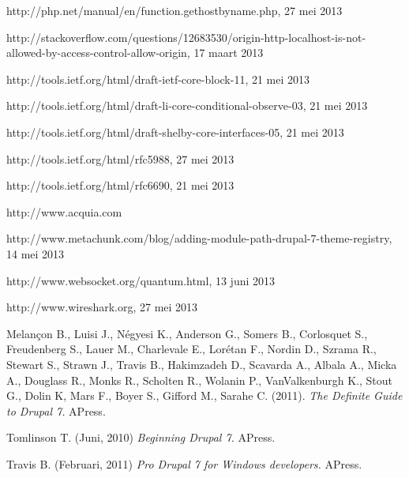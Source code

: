 \begin{thebibliography}{99}
 http://php.net/manual/en/function.gethostbyname.php, 27 mei 2013

 http://stackoverflow.com/questions/12683530/origin-http-localhost-is-not-allowed-by-access-control-allow-origin, 17 maart 2013

 http://tools.ietf.org/html/draft-ietf-core-block-11, 21 mei 2013

 http://tools.ietf.org/html/draft-li-core-conditional-observe-03, 21 mei 2013

 http://tools.ietf.org/html/draft-shelby-core-interfaces-05, 21 mei 2013

 http://tools.ietf.org/html/rfc5988, 27 mei 2013

 http://tools.ietf.org/html/rfc6690, 21 mei 2013

 http://www.acquia.com

 http://www.metachunk.com/blog/adding-module-path-drupal-7-theme-registry, 14 mei 2013

 http://www.websocket.org/quantum.html, 13 juni 2013

 http://www.wireshark.org, 27 mei 2013

 Melançon B., Luisi J., Négyesi K., Anderson G., Somers B., Corlosquet S., Freudenberg S., Lauer M., Charlevale E., Lorétan F., Nordin D., Szrama R., Stewart S., Strawn J., Travis B., Hakimzadeh D., Scavarda A., Albala A., Micka A., Douglass R., Monks R., Scholten R., Wolanin P., VanValkenburgh K., Stout G., Dolin K, Mars F., Boyer S., Gifford M., Sarahe C. (2011). {\em The Definite Guide to Drupal 7.} APress.

 Tomlinson T. (Juni, 2010) {\em Beginning Drupal 7.} APress.

 Travis B. (Februari, 2011) {\em Pro Drupal 7 for Windows developers.} APress.

\end{thebibliography}

